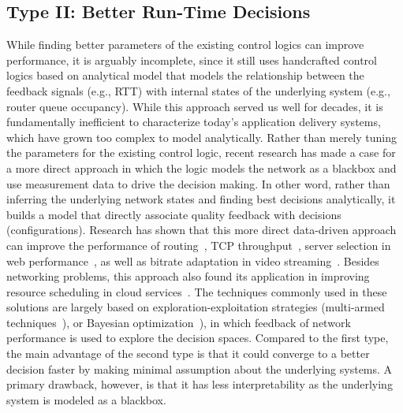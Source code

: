 
\subsection{Type II: Better Run-Time Decisions}

While finding better parameters of the existing control logics
can improve performance, it is arguably incomplete, since it still uses 
handcrafted control logics based on analytical model that models the 
relationship between the feedback signals (e.g., RTT) with internal states of the 
underlying system (e.g., router queue occupancy). 
While this approach served us well for decades, it is fundamentally inefficient 
to characterize today's application delivery systems, which have grown too 
complex to model analytically. Rather than merely tuning the parameters for 
the existing control logic, recent research has made a case for a 
more direct approach in which the logic models the network as a 
blackbox and use measurement data to drive the decision making.
In other word, rather than inferring the underlying network states and finding
best decisions analytically, it builds a model that directly associate quality
feedback with decisions (configurations).
Research has shown that this more direct data-driven 
approach can improve the performance of routing~\cite{schapira2010putting},
TCP throughput~\cite{pcc}, server selection in web 
performance~\cite{footprint}, as well as bitrate adaptation in 
video streaming~\cite{neural-streaming}.
Besides networking problems, this approach also found its
application in improving resource scheduling in 
cloud services~\cite{cherrypick}.
The techniques commonly used in these solutions are largely based on 
exploration-exploitation strategies (multi-armed techniques~\cite{mab}), or 
Bayesian optimization~\cite{bayesian-optimization}), in which feedback of 
network performance is used to explore the decision spaces.
Compared to the first type, the main advantage of the 
second type is that it could converge to a better decision
faster by making minimal assumption about the 
underlying  systems. 
A primary drawback, however, is that it has less interpretability
as the underlying system is modeled as a blackbox.


